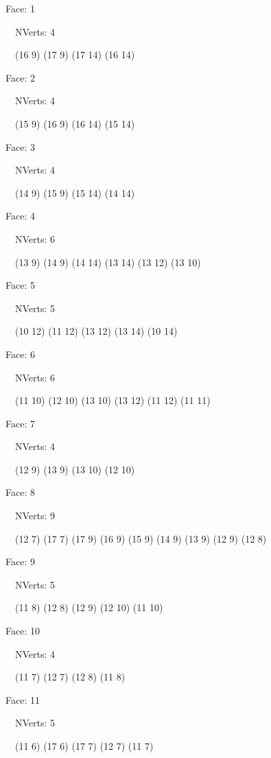 \documentclass{article}
\begin{document}
{\footnotesize 

Face: 1

\   \    NVerts: 4

 \   \   (16 9) (17 9) (17 14) (16 14)}

{\footnotesize 

Face: 2

\   \    NVerts: 4

 \   \   (15 9) (16 9) (16 14) (15 14)}

{\footnotesize 

Face: 3

\   \    NVerts: 4

 \   \   (14 9) (15 9) (15 14) (14 14)}

{\footnotesize 

Face: 4

\   \    NVerts: 6

 \   \   (13 9) (14 9) (14 14) (13 14) (13 12) (13 10)}

{\footnotesize 

Face: 5

\   \    NVerts: 5

 \   \   (10 12) (11 12) (13 12) (13 14) (10 14)}

{\footnotesize 

Face: 6

\   \    NVerts: 6

 \   \   (11 10) (12 10) (13 10) (13 12) (11 12) (11 11)}

{\footnotesize 

Face: 7

\   \    NVerts: 4

 \   \   (12 9) (13 9) (13 10) (12 10)}

{\footnotesize 

Face: 8

\   \    NVerts: 9

 \   \   (12 7) (17 7) (17 9) (16 9) (15 9) (14 9) (13 9) (12 9) (12 8)}

{\footnotesize 

Face: 9

\   \    NVerts: 5

 \   \   (11 8) (12 8) (12 9) (12 10) (11 10)}

{\footnotesize 

Face: 10

\   \    NVerts: 4

 \   \   (11 7) (12 7) (12 8) (11 8)}

{\footnotesize 

Face: 11

\   \    NVerts: 5

 \   \   (11 6) (17 6) (17 7) (12 7) (11 7)}
\end{document}
